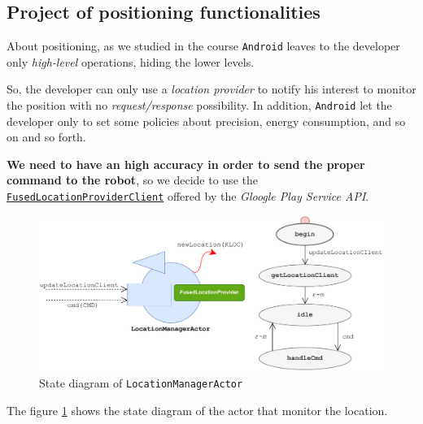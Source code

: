 \subsection{Project of positioning functionalities}

About positioning, as we studied in the course \texttt{Android} leaves to the developer only \textit{high-level} operations, hiding the lower levels.

So, the developer can only use a \textit{location provider} to notify his interest to monitor the position with no \textit{request/response} possibility. In addition, \texttt{Android} let the developer only to set some policies about precision, energy consumption, and so on and so forth.

\textbf{We need to have an high accuracy in order to send the proper command to the robot}, so we decide to use the \href{https://developers.google.com/android/reference/com/google/android/gms/location/FusedLocationProviderClient}{\texttt{FusedLocationProviderClient}} offered by the \textit{Gloogle Play Service API}.

\begin{figure}[h!]
	\centering
	\includegraphics[width=\textwidth]{img/locationmanageractor.pdf}
	\caption{State diagram of \texttt{LocationManagerActor}}
	\label{fig:locationmanageractor}
\end{figure}

The figure \ref{fig:locationmanageractor} shows the state diagram of the actor that monitor the location.

